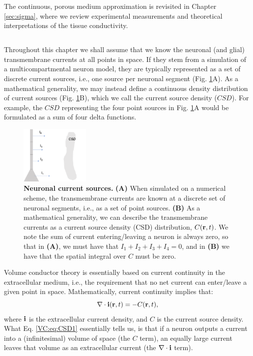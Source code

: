 The continuous, porous medium approximation is revisited in Chapter \ref{sec:sigma}, where we review experimental measurements and theoretical interpretations of the tissue conductivity.


\subsection{}
\label{sec:continuous}
Throughout this chapter we shall assume that we know the neuronal (and glial) transmembrane currents at all points in space. If they stem from a simulation of a multicompartmental neuron model, they are typically represented as a set of discrete current sources, i.e., one source per neuronal segment (Fig. \ref{VC:fig:CSD}A). As a mathematical generality, we may instead define a continuous density distribution of current sources (Fig. \ref{VC:fig:CSD}B), which we call the current source density ($CSD$). For example, the $CSD$ representing the four point sources in Fig. \ref{VC:fig:CSD}A would be formulated as a sum of four delta functions. 

\begin{figure}[!ht]
\begin{center}
\includegraphics[width=0.3\textwidth]{Figures/VC/CSD.png}
\end{center}
\caption{\textbf{Neuronal current sources.}  {\bf (A)} When simulated on a numerical scheme, the transmembrane currents are known at a discrete set of neuronal segments, i.e., as a set of point sources.  {\bf (B)} As a mathematical generality, we can describe the transmembrane currents as a current source density (CSD) distribution, $C({\bf r},t)$. We note the sum of current entering/leaving a neuron is always zero, so that in {\bf (A)}, we must have that $I_1 + I_2 + I_3 + I_4 = 0$, and in {\bf (B)} we have that the spatial integral over $C$ must be zero.
}
\label{VC:fig:CSD}
\end{figure}
Volume conductor theory is essentially based on current continuity in the extracellular medium, i.e., the requirement that no net current can enter/leave a given point in space. Mathematically, current continuity implies that:
\begin{equation}
\nabla \cdot {\bf i}({\bf r}, t) = - C({\bf r}, t),
\label{VC:eq:CSD1}
\end{equation}
where ${\bf i}$ is the extracellular current density, and $C$ is the current source density. What Eq. \ref{VC:eq:CSD1} essentially tells us, is that if a neuron outputs a current into a (infinitesimal) volume of space (the $C$ term), an equally large current leaves that volume as an extracellular current (the $\nabla \cdot {\bf i}$ term).

